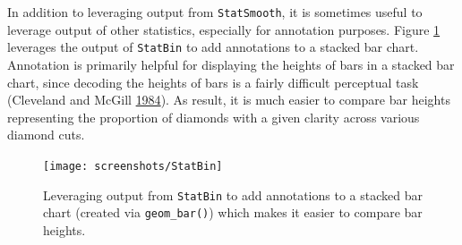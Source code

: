 \documentclass[12pt,]{isuthesis}
\newenvironment{Shaded}{\begin{snugshade}}{\end{snugshade}}
\newcommand{\KeywordTok}[1]{\textcolor[rgb]{0.13,0.29,0.53}{\textbf{{#1}}}}
\newcommand{\DataTypeTok}[1]{\textcolor[rgb]{0.13,0.29,0.53}{{#1}}}
\newcommand{\DecValTok}[1]{\textcolor[rgb]{0.00,0.00,0.81}{{#1}}}
\newcommand{\FloatTok}[1]{\textcolor[rgb]{0.00,0.00,0.81}{{#1}}}
\newcommand{\StringTok}[1]{\textcolor[rgb]{0.31,0.60,0.02}{{#1}}}
\newcommand{\OtherTok}[1]{\textcolor[rgb]{0.56,0.35,0.01}{{#1}}}
\newcommand{\NormalTok}[1]{{#1}}
\begin{document}
In addition to leveraging output from \texttt{StatSmooth}, it is
sometimes useful to leverage output of other statistics, especially for
annotation purposes. Figure \ref{fig:StatBin} leverages the output of
\texttt{StatBin} to add annotations to a stacked bar chart. Annotation
is primarily helpful for displaying the heights of bars in a stacked bar
chart, since decoding the heights of bars is a fairly difficult
perceptual task (Cleveland and McGill
\protect\hyperlink{ref-graphical-perception}{1984}). As result, it is
much easier to compare bar heights representing the proportion of
diamonds with a given clarity across various diamond cuts.

\begin{Shaded}
\end{Shaded}

\begin{figure}
\centering
\texttt{[image: screenshots/StatBin]}
\caption{\label{fig:StatBin}Leveraging output from \texttt{StatBin} to add
annotations to a stacked bar chart (created via \texttt{geom\_bar()})
which makes it easier to compare bar heights.}
\end{figure}
\end{document}
